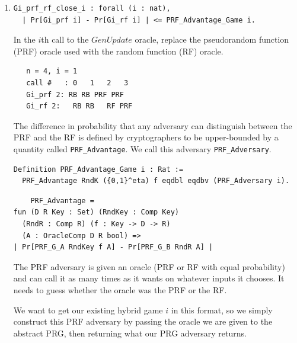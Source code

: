 \documentclass[12pt,lot, lof]{puthesis}
\newcommand{\li} {\lstinline}
\begin{document}
{\begin{enumerate}
    To prove this in Coq, we have to encode the insight that the theorem is inductive over \textbf{appending} to the list, rather than pre-pending (\li|cons|ing) to the beginning of the list. Thus, we induct on the reverse of the list $l$.
    
    We also have to deal with the special case of the first call, since we must use the special \li|GenUpdate_noV| oracle on that call. So we set $calls > 0$, perform the induction on the reverse of the list, then add the first call onto the head of the list.
    
\par
\item \begin{lstlisting}
Gi_prf_rf_close_i : forall (i : nat),
  | Pr[Gi_prf i] - Pr[Gi_rf i] | <= PRF_Advantage_Game i.
  \end{lstlisting}
  
	In the $i$th call to the $GenUpdate$ oracle, replace the pseudorandom function (PRF) oracle used with the random function (RF) oracle. 
	
      \begin{lstlisting}
   n = 4, i = 1
   call #   : 0   1   2   3
   Gi_prf 2: RB RB PRF PRF
   Gi_rf 2:   RB RB   RF PRF
    \end{lstlisting}
	
	The difference in probability that any adversary can distinguish between the PRF and the RF is defined by cryptographers to be upper-bounded by a quantity called \lstinline|PRF_Advantage|. We call this adversary \li|PRF_Adversary|.
	
\begin{lstlisting}
Definition PRF_Advantage_Game i : Rat := 
  PRF_Advantage RndK ({0,1}^eta) f eqdbl eqdbv (PRF_Adversary i).
  \end{lstlisting}
    	    
    \begin{lstlisting}
    PRF_Advantage = 
fun (D R Key : Set) (RndKey : Comp Key) 
  (RndR : Comp R) (f : Key -> D -> R) 
  (A : OracleComp D R bool) =>
| Pr[PRF_G_A RndKey f A] - Pr[PRF_G_B RndR A] |
\end{lstlisting}
	
	The PRF adversary is given an oracle (PRF or RF with equal probability) and can call it as many times as it wants on whatever inputs it chooses. It needs to guess whether the oracle was the PRF or the RF. 
  
We want to get our existing hybrid game $i$ in this format, so we simply construct this PRF adversary by passing the oracle we are given to the abstract PRG, then returning what our PRG adversary returns. 


\end{enumerate}}
\end{document}
